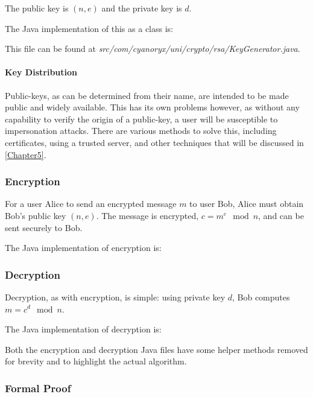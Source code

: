     The public key is $(n,e)$ and the private key is $d$.
    
    The Java implementation of this as a class is:
    
    
    This file can be found at \emph{src/com/cyanoryx/uni/crypto/rsa/KeyGenerator.java}.
    
    \paragraph{Key Distribution} Public-keys, as can be determined from their name, are intended to be made public and widely available. This has its own problems however, as without any capability to verify the origin of a public-key, a user will be susceptible to impersonation attacks. There are various methods to solve this, including certificates, using a trusted server, and other techniques that will be discussed in \textsection\ref{Chapter5}.
    
    \subsubsection{Encryption}
    
    For a user Alice to send an encrypted message $m$ to user Bob, Alice must obtain Bob's public key $(n,e)$. The message is encrypted, $c = m^e \mod n$, and can be sent securely to Bob.
    
    The Java implementation of encryption is:
    
    
    \subsubsection{Decryption}
    
    Decryption, as with encryption, is simple: using private key $d$, Bob computes $m = c^d \mod {n}$.
    
    The Java implementation of decryption is:
    
    
    Both the encryption and decryption Java files have some helper methods removed for brevity and to highlight the actual algorithm.
    
    \subsubsection{Formal Proof}
    
